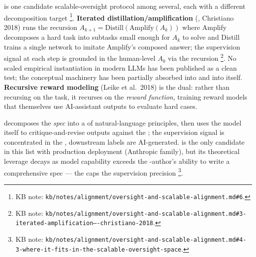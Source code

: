  is one candidate scalable-oversight protocol among several,
each with a different decomposition target%
\footnote{KB note: \texttt{kb/notes/alignment/oversight-and-scalable-alignment.md\#6}.}.
\textbf{Iterated distillation/amplification} (, Christiano 2018)
 runs the
recursion $A_{k+1} = \mathrm{Distill}(\mathrm{Amplify}(A_k))$ where
Amplify decomposes a hard task into subtasks small enough for $A_k$
to solve and Distill trains a single network to imitate Amplify's
composed answer; the supervision signal at each step is grounded in
the human-level $A_0$ via the recursion%
\footnote{KB note: \texttt{kb/notes/alignment/oversight-and-scalable-alignment.md\#3-iterated-amplification---christiano-2018}.}.
No scaled empirical instantiation in modern LLMs has been published
as a clean test; the conceptual machinery has been partially absorbed
into  and into  itself. \textbf{Recursive reward modeling}
(Leike et al.\ 2018)  is the dual: rather than recursing on the task, it
recurses on the \emph{reward function}, training reward models that
themselves use AI-assistant outputs to evaluate hard cases.

\textbf{} \citep{bai2022-cai} decomposes the
\emph{ spec} into a  of natural-language principles,
then uses the model itself to critique-and-revise outputs against the
; the supervision signal is concentrated in the
, downstream labels are AI-generated.  is the only
candidate in this list with production deployment (Anthropic 
family), but its theoretical leverage decays as model capability
exceeds the -author's ability to write a comprehensive
spec --- the  caps the supervision precision%
\footnote{KB note: \texttt{kb/notes/alignment/oversight-and-scalable-alignment.md\#4-3-where-it-fits-in-the-scalable-oversight-space}.}.


